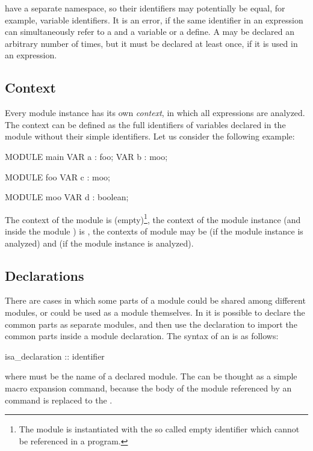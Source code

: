 have a separate namespace, so their
identifiers may potentially be equal, for example, variable
identifiers. 
%
It is an error, if the same identifier in an expression can
simultaneously refer to a  and a variable
or a define.
%
A  may be declared an arbitrary number of
times, but it must be declared at least once, if it is used in an
expression.

\subsection{Context}
\label{Context}

Every module instance has its own \emph{context}, in which all
expressions are analyzed. 
%
The context can be defined as the full identifiers of variables
declared in the module without their simple identifiers.
%
Let us consider the following example:
%
\begin{nusmvCode}
MODULE main
  VAR a : foo;
  VAR b : moo;

MODULE foo
  VAR c : moo;

MODULE moo
  VAR d : boolean;
\end{nusmvCode}
%
The context of the module  is (empty)\footnote{
The module  is instantiated with the so called empty
identifier which cannot be referenced in a program.}, the context of
the module instance  (and inside the module ) is
, the contexts of module  may be   (if
the module instance  is analyzed) and  (if the
module instance  is analyzed).

\subsection{ Declarations}
\label{ISA Declarations}
%
There are cases in which some parts of a module could be shared among
different modules, or could be used as a module themselves. 
%
In \nusmv it is possible to declare the common parts as separate
modules, and then use the  declaration to import the
common parts inside a module declaration. 
%
The syntax of an  is as follows:
%
\begin{Grammar}
isa_declaration ::  identifier
\end{Grammar}
%
where  must be the name of a declared module. 
%
The  can be thought as a simple macro
expansion command, because the body of the module referenced by an
 command is replaced to the .

